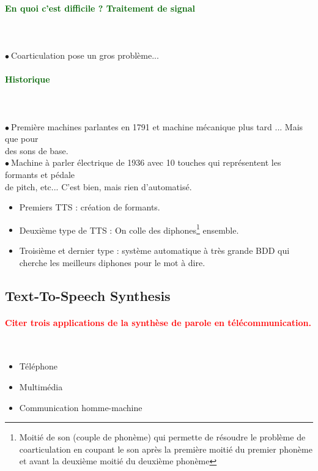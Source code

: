 \documentclass[letterpaper, 12pt]{article}
\newcommand{\alinea}{
\hspace*{0.3cm}}
\newcommand{\red}[1]{
	\textcolor{red}{#1}
}
\newcommand{\green}[1]{
	\textcolor{darkgreen}{#1}
}
\newcommand{\point}{$\bullet\ $}
\begin{document}
		\paragraph{\green{En quoi c'est difficile ? Traitement de signal}}~\\~\\
			\point Coarticulation pose un gros problème...
		\paragraph{\green{Historique}}~\\~\\
			\point Première machines parlantes en 1791 et machine mécanique plus tard ... Mais que pour 
				\\\alinea des sons de base.\\
			\point Machine à parler électrique de 1936 avec 10 touches qui représentent les formants et pédale 
				\\\alinea de pitch, etc... C'est bien, mais rien d'automatisé.\\
			\begin{itemize}
			 	\setlength{\itemsep}{0pt}		
			 	\setlength{\parskip}{0pt}		
			 	\setlength{\parsep}{0pt}	
			 	\item Premiers TTS : création de formants.
			 	\item Deuxième type de TTS : On colle des diphones\footnote{Moitié de son (couple de phonème) qui 
					permette de résoudre le problème de coarticulation en coupant le son après la première moitié du 
					premier phonème et avant la deuxième moitié du deuxième phonème} ensemble.
				\item Troisième et dernier type : système automatique à très grande BDD qui cherche les meilleurs
					diphones pour le mot à dire.
			 \end{itemize}
\pagebreak
	\subsection{Text-To-Speech Synthesis}
		\paragraph{\red{Citer trois applications de la synthèse de parole en télécommunication.}}~\\
		\vspace*{-0.66cm}
			\begin{itemize}
				\setlength{\itemsep}{0pt}		
				\setlength{\parskip}{0pt}		
				\setlength{\parsep}{0pt}	
				\item Téléphone
				\item Multimédia
				\item Communication homme-machine
			\end{itemize}
\end{document}

